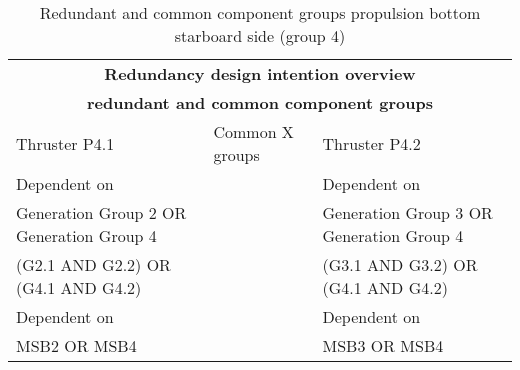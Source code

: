 \begin{table}[H]
    \centering
    \begin{tabular}{|m{5.6cm}|m{2.5cm}|m{5.6cm}|}
    \hline
    \multicolumn{3}{|c|}{\textbf{Redundancy design intention overview}} \\
    \multicolumn{3}{|c|}{\textbf{redundant and common component groups}} \\
    \hline
    Thruster P4.1 & Common X groups & Thruster P4.2 \\
    \hline
    Dependent on & & Dependent on \\
    \hline
    Generation Group 2 OR Generation Group 4 & & Generation Group 3 OR Generation Group 4 \\
    \hline
    (G2.1 AND G2.2) OR (G4.1 AND G4.2) & & (G3.1 AND G3.2) OR (G4.1 AND G4.2) \\
    \hline
    Dependent on & & Dependent on \\
    \hline
    MSB2 OR MSB4 & & MSB3 OR MSB4 \\    
    \hline
    \end{tabular}
    \caption{Redundant and common component groups propulsion bottom starboard side (group 4)}
    \label{tab:RedundantComponentGroupsThrusters4}
\end{table}
